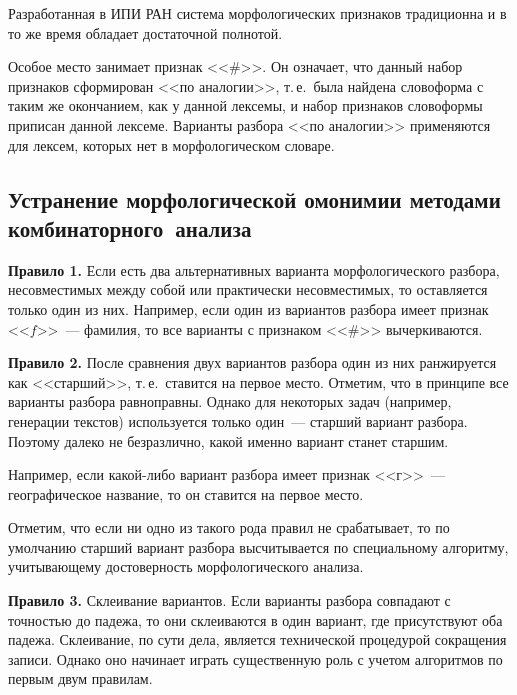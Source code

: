\begin{multicols}{2}
     Разработанная в ИПИ РАН система морфологических признаков 
традиционна и в то же время обладает достаточной полнотой. 

Особое место 
занимает признак <<\#>>. Он означает, что данный набор признаков 
сформирован <<по аналогии>>, т.\,е.\ была найдена словоформа с таким же 
окончанием, как у данной лексемы, и набор признаков словоформы приписан 
данной лексеме. Варианты разбора <<по аналогии>> применяются для лексем, 
которых нет в морфологическом словаре. 


\subsection{Устранение морфологической омонимии методами 
комбинаторного~анализа} 
     
     \textbf{Правило 1.} Если есть два альтернативных варианта 
морфологического разбора, несовместимых между собой или практически 
несовместимых, то оставляется только один из них. Например, если один из 
вариантов разбора имеет признак <<$f$>>~--- фамилия, то все варианты с 
признаком <<\#>> вычеркиваются. 

\smallskip

\textbf{Правило 2.} После сравнения двух вариантов разбора один из них 
ранжируется как <<старший>>, т.\,е.\ ставится на первое место. Отметим, что в 
принципе все варианты разбора равноправны. Однако для некоторых задач 
(например, генерации текстов) используется только один~--- старший вариант 
разбора. Поэтому далеко не безразлично, какой именно вариант станет 
старшим.
     
     Например, если какой-либо вариант разбора имеет признак <<г>>~--- 
географическое название, то он ставится на первое место. 
     
     Отметим, что если ни одно из такого рода правил не срабатывает, то по 
умолчанию старший вариант разбора высчитывается по специальному 
алгорит\-му, учитывающему достоверность морфологического анализа. 

\smallskip
     
     \textbf{Правило 3.} Склеивание вариантов. Если варианты разбора 
совпадают с точностью до падежа, то они склеиваются в один вариант, где 
присутствуют оба падежа. Склеивание, по сути дела, является технической 
процедурой сокращения записи. Однако оно начинает играть существенную 
роль с учетом алгоритмов по первым двум правилам.
     

\end{multicols}
